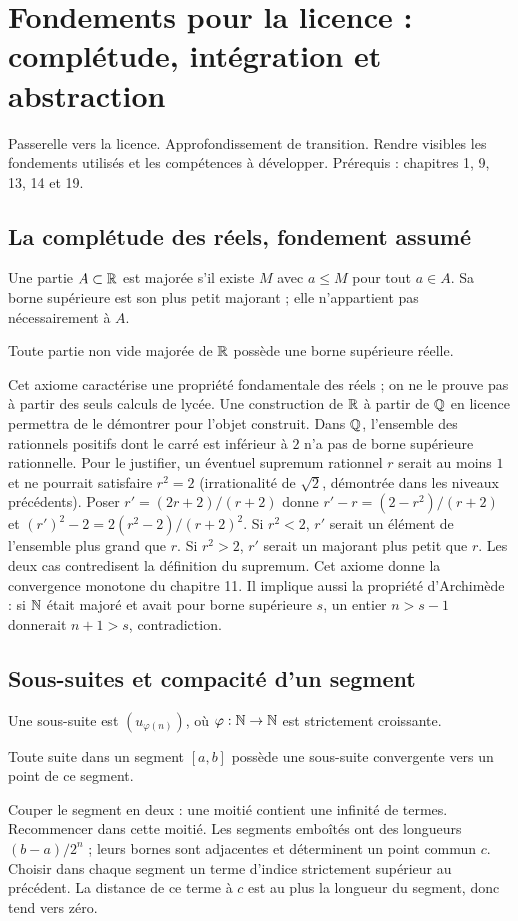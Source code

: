 \documentclass[../cours_tle.tex]{subfiles}
\begin{document}
\setcounter{chapter}{35}
\chapter{Fondements pour la licence : complétude, intégration et abstraction}
\label{ch:36}
\begin{objectif}
Passerelle vers la licence. Approfondissement de transition. Rendre visibles les fondements utilisés et les compétences à développer. Prérequis : chapitres 1, 9, 13, 14 et 19.
\end{objectif}
\section{La complétude des réels, fondement assumé}
Une partie $A\subset\mathbb{R}$ est majorée s'il existe $M$ avec $a\le M$ pour tout $a\in A$. Sa borne supérieure est son plus petit majorant ; elle n'appartient pas nécessairement à $A$.
\begin{propriete}
Toute partie non vide majorée de $\mathbb{R}$ possède une borne supérieure réelle.
\end{propriete}
Cet axiome caractérise une propriété fondamentale des réels ; on ne le prouve pas à partir des seuls calculs de lycée. Une construction de $\mathbb{R}$ à partir de $\mathbb{Q}$ en licence permettra de le démontrer pour l'objet construit.
Dans $\mathbb{Q}$, l'ensemble des rationnels positifs dont le carré est inférieur à $2$ n'a pas de borne supérieure rationnelle.
Pour le justifier, un éventuel supremum rationnel $r$ serait au moins $1$ et ne pourrait satisfaire $r^2=2$ (irrationalité de $\sqrt2$, démontrée dans les niveaux précédents). Poser $r'=(2r+2)/(r+2)$ donne
$r'-r=(2-r^2)/(r+2)$ et $(r')^2-2=2(r^2-2)/(r+2)^2$.
Si $r^2<2$, $r'$ serait un élément de l'ensemble plus grand que $r$. Si $r^2>2$, $r'$ serait un majorant plus petit que $r$. Les deux cas contredisent la définition du supremum.
Cet axiome donne la convergence monotone du chapitre 11.
Il implique aussi la propriété d'Archimède : si $\mathbb{N}$ était majoré et avait pour borne supérieure $s$, un entier $n>s-1$ donnerait $n+1>s$, contradiction.
\section{Sous-suites et compacité d'un segment}
Une sous-suite est $(u_{\varphi(n)})$, où $\varphi:\mathbb{N}\to\mathbb{N}$ est strictement croissante.
\begin{theoreme}
Toute suite dans un segment $[a,b]$ possède une sous-suite convergente vers un point de ce segment.
\end{theoreme}
\begin{demonstration}
Couper le segment en deux : une moitié contient une infinité de termes. Recommencer dans cette moitié. Les segments emboîtés ont des longueurs $(b-a)/2^n$ ; leurs bornes sont adjacentes et déterminent un point commun $c$.
Choisir dans chaque segment un terme d'indice strictement supérieur au précédent. La distance de ce terme à $c$ est au plus la longueur du segment, donc tend vers zéro.
\end{demonstration}
\end{document}
